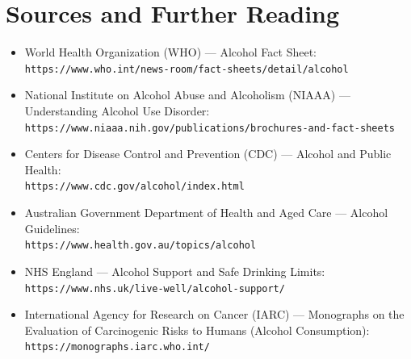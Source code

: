 \section*{Sources and Further Reading}
\begin{itemize}
    \item World Health Organization (WHO) --- Alcohol Fact Sheet:\\ \texttt{https://www.who.int/news-room/fact-sheets/detail/alcohol}
    \item National Institute on Alcohol Abuse and Alcoholism (NIAAA) --- Understanding Alcohol Use Disorder:\\ \texttt{https://www.niaaa.nih.gov/publications/brochures-and-fact-sheets}
    \item Centers for Disease Control and Prevention (CDC) --- Alcohol and Public Health:\\ \texttt{https://www.cdc.gov/alcohol/index.html}
    \item Australian Government Department of Health and Aged Care --- Alcohol Guidelines:\\ \texttt{https://www.health.gov.au/topics/alcohol}
    \item NHS England --- Alcohol Support and Safe Drinking Limits:\\ \texttt{https://www.nhs.uk/live-well/alcohol-support/}
    \item International Agency for Research on Cancer (IARC) --- Monographs on the Evaluation of Carcinogenic Risks to Humans (Alcohol Consumption):\\ \texttt{https://monographs.iarc.who.int/}
\end{itemize}